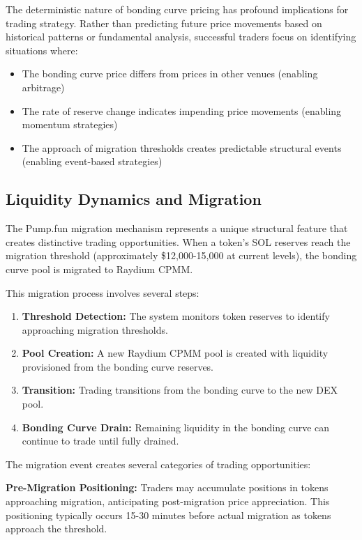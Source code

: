 \documentclass[12pt,a4paper]{article}
\begin{document}
The deterministic nature of bonding curve pricing has profound implications for trading strategy. Rather than predicting future price movements based on historical patterns or fundamental analysis, successful traders focus on identifying situations where:

\begin{itemize}
\item The bonding curve price differs from prices in other venues (enabling arbitrage)
\item The rate of reserve change indicates impending price movements (enabling momentum strategies)
\item The approach of migration thresholds creates predictable structural events (enabling event-based strategies)
\end{itemize}

\subsection{Liquidity Dynamics and Migration}

The Pump.fun migration mechanism represents a unique structural feature that creates distinctive trading opportunities. When a token's SOL reserves reach the migration threshold (approximately \$12,000-15,000 at current levels), the bonding curve pool is migrated to Raydium CPMM.

This migration process involves several steps:

\begin{enumerate}
\item \textbf{Threshold Detection:} The system monitors token reserves to identify approaching migration thresholds.
\item \textbf{Pool Creation:} A new Raydium CPMM pool is created with liquidity provisioned from the bonding curve reserves.
\item \textbf{Transition:} Trading transitions from the bonding curve to the new DEX pool.
\item \textbf{Bonding Curve Drain:} Remaining liquidity in the bonding curve can continue to trade until fully drained.
\end{enumerate}

The migration event creates several categories of trading opportunities:

\textbf{Pre-Migration Positioning:} Traders may accumulate positions in tokens approaching migration, anticipating post-migration price appreciation. This positioning typically occurs 15-30 minutes before actual migration as tokens approach the threshold.
\end{document}
